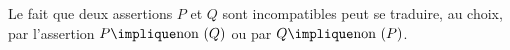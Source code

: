 Le fait que deux assertions $P$ et $Q$ sont incompatibles peut se traduire, au choix, par l'assertion $P \implique \text{non}\ (Q)$ ou par $Q \implique \text{non}\  (P)$.

\begin{reponses}
\end{reponses}

